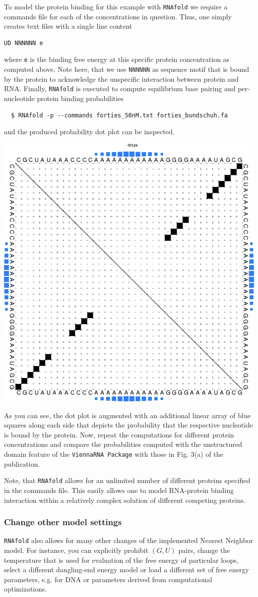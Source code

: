 \documentclass[a4paper]{article}
\begin{document}
To model the protein binding for this example with \texttt{RNAfold} we require
a commands file for each of the concentrations in question. Thus, one simply creates
text files with a single line content
\begin{verbatim}
UD NNNNNN e
\end{verbatim}
where \texttt{e} is the binding free energy at this specific protein concentration
as computed above. Note here, that we use \texttt{NNNNNN} as sequence motif that is
bound by the protein to acknowledge the unspecific interaction between protein and
RNA. Finally, \texttt{RNAfold} is executed to compute equilibrium base pairing and
per-nucleotide protein binding probabilities
\begin{verbatim}
  $ RNAfold -p --commands forties_50nM.txt forties_bundschuh.fa
\end{verbatim}
and the produced probability dot plot can be inspected.
\begin{center}
\includegraphics[width=.5\textwidth]{Figures/forties_50nM_dp.eps}\\
\end{center}
As you can see, the dot plot is augmented with an additional linear array of blue squares
along each side that depicts the probability that the respective nucleotide is bound
by the protein. Now, repeat the computations for different protein concentrations and
compare the probabilities computed with the unstructured domain feature of the
\texttt{ViennaRNA Package} with those in Fig. 3(a) of the publication.

Note, that \texttt{RNAfold} allows for an unlimited number of different proteins
specified in the commands file. This easily allows one to model RNA-protein binding
interaction within a relatively complex solution of different competing proteins.

\subsubsection{Change other model settings}
\texttt{RNAfold} also allows for many other changes of the implemented Nearest Neighbor
model. For instance, you can explicitly prohibit $(G,U)$ pairs, change the temperature
that is used for evaluation of the free energy of particular loops, select a different
dangling-end energy model or load a different set of free energy parameters, e.g. for
DNA or parameters derived from computational optimizations.
\end{document}
